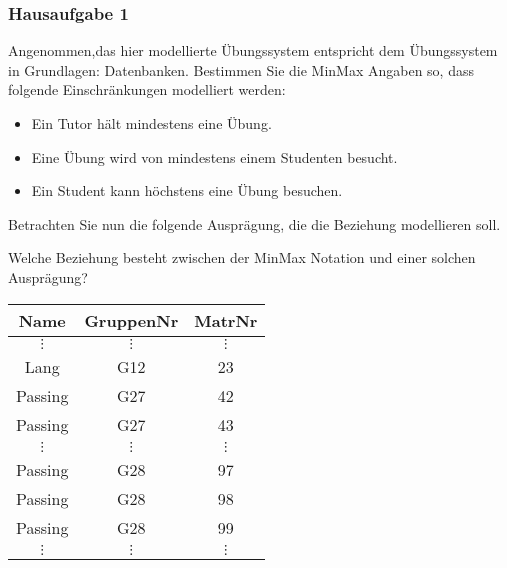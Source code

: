 \begin{frame}
	\frametitle{Hausaufgabe 1}
	\vspace{0.5cm}

	\begin{multicols}{2}
		Angenommen,das hier modellierte Übungssystem entspricht dem Übungssystem in Grundlagen:
		Datenbanken. Bestimmen Sie die MinMax Angaben so, dass folgende Einschränkungen
		modelliert werden:
		\begin{itemize}
			\item Ein Tutor hält mindestens eine Übung.
			\item Eine Übung wird von mindestens einem Studenten besucht.
			\item Ein Student kann höchstens eine Übung besuchen.
		\end{itemize}
		Betrachten Sie nun die folgende Ausprägung, die die Beziehung modellieren soll.

		Welche Beziehung besteht zwischen der MinMax Notation und einer solchen
		Ausprägung?

		\vfill\columnbreak

		\begin{table}[]
			\begin{tabular}{c|c|c}
				Name         & GruppenNr    & MatrNr       \\ \hline
				\( \vdots \) & \( \vdots \) & \( \vdots \) \\
				Lang         & G12          & 23           \\
				Passing      & G27          & 42           \\
				Passing      & G27          & 43           \\
				\( \vdots \) & \( \vdots \) & \( \vdots \) \\
				Passing      & G28          & 97           \\
				Passing      & G28          & 98           \\
				Passing      & G28          & 99           \\
				\( \vdots \) & \( \vdots \) & \( \vdots \) \\
			\end{tabular}
		\end{table}

	\end{multicols}
\end{frame}

